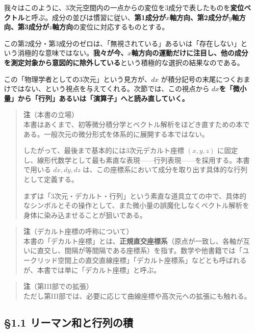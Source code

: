 \documentclass[a4paper,12pt,openany]{book}
\begin{document}
我々はこのように、3次元空間内の一点からの変位を3成分で表したものを\textbf{変位ベクトル}と呼ぶ。成分の並びは慣習に従い、\textbf{第1成分が}\(x\)\textbf{軸方向、第2成分が}\(y\)\textbf{軸方向、第3成分が}\(z\)\textbf{軸方向}の変位に対応するものとする。

この第2成分・第3成分のゼロは、「無視されている」あるいは「存在しない」という消極的な意味ではない。\textbf{我々が今、}\(x\)\textbf{軸方向の運動だけに注目し、他の成分を測定対象から意図的に除外している}という積極的な選択の結果なのである。

この「物理学者としての3次元」という見方が、\(dx\)
が積分記号の末尾につくおまけではない、という視点を与えてくれる。次節では、この視点から
\(dx\)\textbf{を「微小量」から「行列」あるいは「演算子」へと読み直していく。}

\begin{quote}
\textbf{注}（本書の立場）\\
本書はあくまで、初等微分積分学とベクトル解析をほどき直すための本である。一般次元の微分形式を体系的に展開する本ではない。

したがって、最後まで基本的には3次元デカルト座標 \((x,y,z)\)
に固定し、線形代数学として最も素直な表現——行列表現——を採用する。本書で用いる
\(dx,dy,dz\)
は、この座標系において成分を取り出す具体的な行列として定義する。

まずは「3次元・デカルト・行列」という素直な道具立ての中で、具体的なシンボルとその操作として、また微小量の誤魔化しなくベクトル解析を身体に染み込ませることが狙いである。
\end{quote}

\begin{quote}
\textbf{注}（デカルト座標の呼称について）\\
本書の「デカルト座標」とは、\textbf{正規直交座標系}（原点が一致し、各軸が互いに直交し、間隔が等間隔である座標系）を指す。数学や他書籍では「ユークリッド空間上の直交直線座標」「デカルト座標系」などとも呼ばれるが、本書では単に「デカルト座標」と呼ぶ。
\end{quote}

\begin{quote}
\textbf{注}（第III部での拡張）\\
ただし第III部では、必要に応じて曲線座標や高次元への拡張にも触れる。
\end{quote}

\par\vspace{0.35em}\par

\hypertarget{ux30eaux30fcux30deux30f3ux548cux3068ux884cux5217ux306eux7a4d}{%
\subsection{§1.1
リーマン和と行列の積}\label{ux30eaux30fcux30deux30f3ux548cux3068ux884cux5217ux306eux7a4d}}
\end{document}

